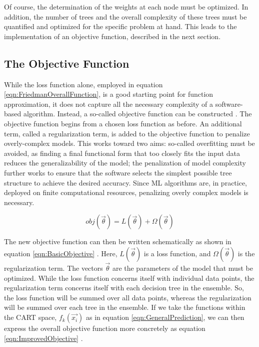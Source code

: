 \documentclass[12pt]{ucsddissertation}
\begin{document}
Of course, the determination of the weights at each node must be optimized. In addition, the number of trees and the overall complexity of these trees must be quantified and optimized for the specific problem at hand. This leads to the implementation of an objective function, described in the next section.

\subsection{The Objective Function} \label{sec:ObjectiveFunction}
While the loss function alone, employed in equation \ref{eqn:FriedmanOverallFunction}, is a good starting point for function approximation, it does not capture all the necessary complexity of a software-based algorithm. Instead, a so-called objective function can be constructed \cite{XGBoostPaper,XGBoostDocumentation}. The objective function begins from a chosen loss function as before. An additional term, called a regularization term, is added to the objective function to penalize overly-complex models. This works toward two aims: so-called overfitting must be avoided, as finding a final functional form that too closely fits the input data reduces the generalizability of the model; the penalization of model complexity further works to ensure that the software selects the simplest possible tree structure to achieve the desired accuracy. Since ML algorithms are, in practice, deployed on finite computational resources, penalizing overly complex models is necessary.

\begin{equation}\label{eqn:BasicObjective}
    obj(\vec{\theta}) = L(\vec{\theta}) + \Omega(\vec{\theta})
\end{equation}

The new objective function can then be written schematically as shown in equation \ref{eqn:BasicObjective} \cite{XGBoostPaper}. Here, $L(\vec{\theta})$ is a loss function, and $\Omega(\vec{\theta})$ is the regularization term. The vectors $\vec{\theta}$ are the parameters of the model that must be optimized. While the loss function concerns itself with individual data points, the regularization term concerns itself with each decision tree in the ensemble. So, the loss function will be summed over all data points, whereas the regularization will be summed over each tree in the ensemble. If we take the functions within the CART space, $f_k(\vec{x_i})$ as in equation \ref{eqn:GeneralPrediction}, we can then express the overall objective function more concretely as equation \ref{eqn:ImprovedObjective} \cite{XGBoostDocumentation}.
\end{document}
